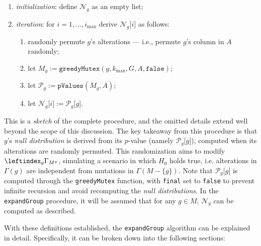 \begin{enumerate}
    \item \textit{initialization}: define $\mathcal N_g$ as an empty list;
    \item \textit{iteration}: for $i = 1, \ldots, i_\mathrm{max}$ derive $\mathcal N_g \texttt{[}i\texttt{]}$ as follows:

        \begin{enumerate}
            \item randomly permute $g$'s alterations --- i.e., permute $g$'s column in $A$ randomly;
            \item let $M_g := \texttt{greedyMutex}(g, k_\mathrm{max}, G, A, \texttt{false})$;
            \item let $\mathcal P_g := \texttt{pValues}(M_g, A)$;
            \item let $\mathcal N_g \texttt{[}i\texttt{]} := \mathcal P_g\texttt{[}g\texttt{]}$.
        \end{enumerate}
\end{enumerate}

This is a \textit{sketch} of the complete procedure, and the omitted details extend well beyond the scope of this discussion. The key takeaway from this procedure is that $g$'s \textit{null distribution} is derived from its $p$-value (namely $\mathcal P_g\texttt{[}g\texttt{]}$), computed when its alterations are randomly permuted. This randomization aims to modify $\inters$, simulating a scenario in which $H_0$ holds true, i.e. alterations in $\Gamma(g)$ are independent from mutations in $\Gamma(M - \{g\})$. Note that $\mathcal P_g\texttt{[}g\texttt{]}$ is computed through the \texttt{greedyMutex} function, with \texttt{final} set to \texttt{false} to prevent infinite recursion and avoid recomputing the \textit{null distributions}. In the \texttt{expandGroup} procedure, it will be assumed that for any $g \in M$, $\mathcal N_g$ can be computed as described.

With these definitions established, the \texttt{expandGroup} algorithm can be explained in detail. Specifically, it can be broken down into the following sections:

